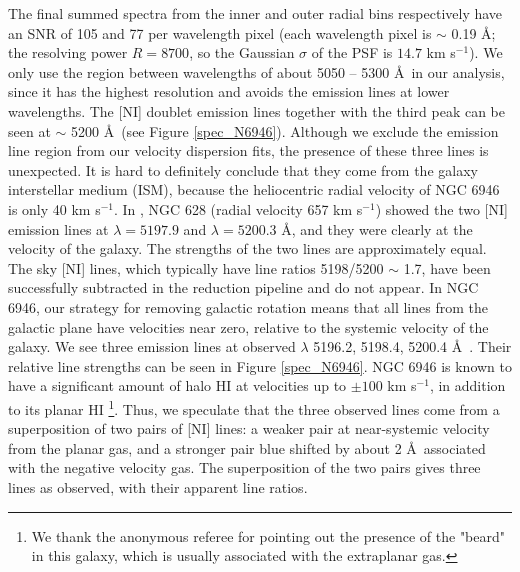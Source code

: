 \documentclass[fleqn,usenatbib]{mnras}
\newcommand{\kms}{km s$^{-1}$}
\begin{document}
The final summed spectra from the inner and outer radial bins respectively have an SNR of 105 and 77 per wavelength pixel %
 (each wavelength pixel is $\sim$ 0.19 \AA;  the resolving power $R = 8700$, so the Gaussian $\sigma$ of the PSF is $14.7$ \kms). We only use the region between wavelengths of about 5050 -- 5300 \AA \ in our analysis, since it has the highest resolution and avoids the emission lines at 
lower wavelengths. The [NI] doublet emission lines together with the third peak can be seen at $\sim$ 5200 \AA \ (see Figure \ref{spec_N6946}). 
Although we exclude the emission line region from our velocity dispersion fits, the presence of these three lines is unexpected. 
It is hard to definitely conclude that they come from the galaxy interstellar medium (ISM), because the heliocentric radial velocity of 
NGC 6946 is only 40 km s$^{-1}$.
In , NGC 628 (radial velocity 657 km s$^{-1}$) showed the two [NI] 
emission lines at $\lambda = 5197.9$ and $\lambda = 5200.3$ \AA, and they were clearly at the 
velocity of the galaxy. The strengths of the two lines are approximately equal.  
The sky [NI] lines, which typically have line ratios 5198/5200 $\sim$ 1.7, have been 
successfully subtracted in the reduction pipeline and do not appear.
In NGC 6946, our strategy for removing galactic rotation means that all lines 
from the galactic plane have velocities near zero, relative to the systemic velocity 
of the galaxy. We see three emission lines at observed $\lambda$ 5196.2, 5198.4, 
5200.4 \AA \ . Their relative line strengths can be seen in Figure \ref{spec_N6946}. 
NGC 6946 is known to have a significant amount of halo HI at velocities up to $\pm 100$ km s$^{-1}$, 
in addition to its planar HI \citep{boomsma08}\footnote{We thank the anonymous referee for pointing out the presence of the "beard" in this galaxy, which is usually associated with the extraplanar gas.}. Thus, we speculate that the three 
observed lines come from a superposition of two pairs of [NI] lines: a  weaker 
pair at near-systemic velocity from the planar gas, and a stronger pair blue shifted 
by about 2 \AA \ associated with the negative velocity gas. The superposition of 
the two pairs gives three lines as observed, with their apparent line ratios.
\end{document}
